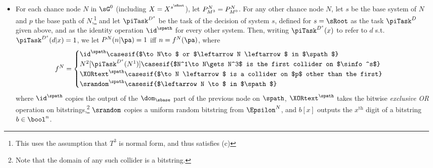 \begin{definition}
\begin{itemize}
    
    
    \item For each chance node $N$ in $\sGoriginalInModelConstruction$ (including $X=X^{s^\sRoot}$), let $P_{M^3}^N=P^N_{M^0}$. For any other chance node $N$, let $s$ be the base system of $N$ and $p$ the base path of $N$,\footnote{This uses the assumption that $T^3$ is normal form, and thus satisfies (c) \systemsAndPathsUniqueness} and let $\piTask^{D^s}$ be the task of the decision of system $s$, defined for $s=\sRoot$ as the task $\piTask^{D}$ given above, and as the identity operation \emph{$\id^{\spath}$}
    for every other system. Then, writing $\piTask^{D^s}(x)$ to refer to $d$ s.t. $\piTask^{D^s}(d|x)=1$, we let $P^N(n|\pa)=1$ iff $n=f^N(\pa)$, where
    \[f^N =
        \begin{cases} 
        {\id}^{\spath} \casesif {$\to N\to$ or  $\leftarrow N \leftarrow$ in $\spath$}\\
        N^2[\piTask^{D^s}(N^1)] \casesif {$N^1\to N\gets N^3$ is the first collider on $\sinfo^s$}\\
        {\XORtext}^{\spath}\casesif {$\to N \leftarrow$ is a collider on $p$ other than the first}\\
        \srandom^\spath \casesif {$\leftarrow N \to$ in $\spath$}
        \end{cases}
    \]
    where $\id^{\spath}$ copies the output of the $\dom_\sbase$ part of the previous node on $\spath$, $\XORtext^{\spath}$ takes the bitwise \emph{exclusive OR} operation on bitstrings,\footnote{Note that the domain of any such collider is a bitstring.} $\srandom$ copies a uniform random bitstring from $\Epsilon^N$, and \emph{$b[x]$} outputs the $x^\text{th}$ digit of a bitstring $b\in \bool^n$. 
    

\end{itemize}
\end{definition}
